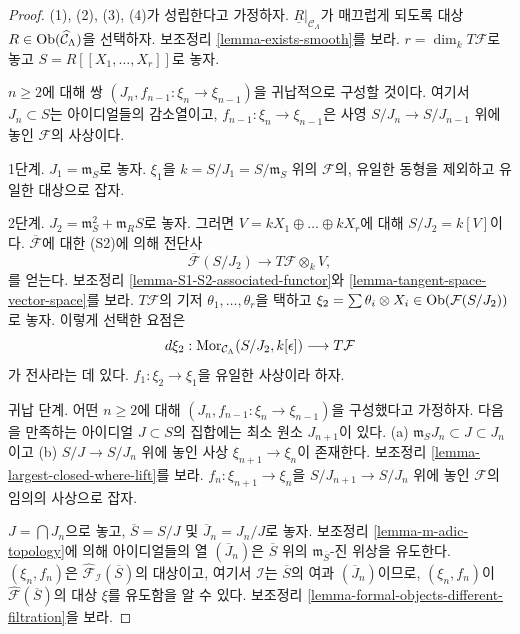 \begin{proof}
(1), (2), (3), (4)가 성립한다고 가정하자.
$\underline{R}|_{\mathcal{C}_\Lambda}$가 매끄럽게 되도록
대상 $R \in \mathop{\mathrm{Ob}}\nolimits(\widehat{\mathcal{C}}_\Lambda)$을 선택하자.
보조정리 \ref{lemma-exists-smooth}를 보라.
$r = \dim_k T\mathcal{F}$로 놓고 $S = R[[X_1, \ldots, X_r]]$로 놓자.

\medskip\noindent
$n \geq 2$에 대해 쌍
$(J_n, f_{n - 1} : \xi_n \to \xi_{n - 1})$을 귀납적으로
구성할 것이다. 여기서
$J_n \subset S$는 아이디얼들의 감소열이고,
$f_{n - 1} : \xi_n \to \xi_{n - 1}$은 사영
$S/J_n \to S/J_{n - 1}$ 위에 놓인 $\mathcal{F}$의 사상이다.

\medskip\noindent
1단계. $J_1 = \mathfrak m_S$로 놓자.
$\xi_1$을 $k = S/J_1 = S/\mathfrak m_S$ 위의
$\mathcal{F}$의, 유일한 동형을 제외하고 유일한 대상으로 잡자.

\medskip\noindent
2단계. $J_2 = \mathfrak m_S^2 + \mathfrak{m}_R S$로 놓자.
그러면 $V = kX_1 \oplus \ldots \oplus kX_r$에 대해
$S/J_2 = k[V]$이다. $\overline{\mathcal{F}}$에 대한 (S2)에 의해
전단사
$$
\overline{\mathcal{F}}(S/J_2)
\longrightarrow
T\mathcal{F} \otimes_k V,
$$
를 얻는다. 보조정리 \ref{lemma-S1-S2-associated-functor}와
\ref{lemma-tangent-space-vector-space}를 보라.
$T\mathcal{F}$의 기저 $\theta_1, \ldots, \theta_r$을 택하고
$\xi_2 = \sum \theta_i \otimes X_i \in \mathop{\mathrm{Ob}}\nolimits(\mathcal{F}(S/J_2))$로 놓자.
이렇게 선택한 요점은
$$
d\xi_2 :
\mathop{\mathrm{Mor}}\nolimits_{\mathcal{C}_\Lambda}(S/J_2, k[\epsilon])
\longrightarrow
T\mathcal{F}
$$
가 전사라는 데 있다. $f_1 : \xi_2 \to \xi_1$을 유일한 사상이라 하자.

\medskip\noindent
귀납 단계. 어떤 $n \geq 2$에 대해
$(J_n, f_{n - 1} : \xi_n \to \xi_{n - 1})$을 구성했다고 가정하자.
다음을 만족하는 아이디얼 $J \subset S$의 집합에는
최소 원소 $J_{n + 1}$이 있다.
(a) $\mathfrak m_S J_n \subset J \subset J_n$이고
(b) $S/J \to S/J_n$ 위에 놓인 사상
$\xi_{n + 1} \to \xi_n$이 존재한다. 보조정리
\ref{lemma-largest-closed-where-lift}를 보라.
$f_n : \xi_{n + 1} \to \xi_n$을
$S/J_{n + 1} \to S/J_n$ 위에 놓인 $\mathcal{F}$의 임의의
사상으로 잡자.

\medskip\noindent
$J = \bigcap J_n$으로 놓고, $\overline{S} = S/J$ 및
$\overline{J}_n = J_n/J$로 놓자.
보조정리 \ref{lemma-m-adic-topology}에 의해 아이디얼들의 열
$(\overline{J}_n)$은 $\overline{S}$ 위의
$\mathfrak m_{\overline{S}}$-진 위상을 유도한다.
$(\xi_n, f_n)$은 $\widehat{\mathcal{F}}_\mathcal{I}(\overline{S})$의
대상이고, 여기서 $\mathcal{I}$는 $\overline{S}$의 여과
$(\overline{J}_n)$이므로, $(\xi_n, f_n)$이
$\widehat{\mathcal{F}}(\overline{S})$의 대상 $\xi$를 유도함을 알 수 있다.
보조정리 \ref{lemma-formal-objects-different-filtration}을 보라.


\end{proof}
